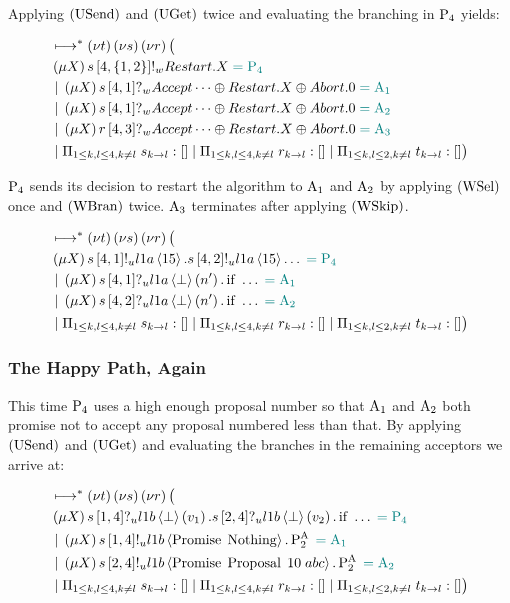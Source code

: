 Applying $\RUsend$ and $\RUget$ twice and evaluating the branching in $\Proposer{4}$ yields:

\begin{align*}
&\mapstostar \NuChannels \big (\\
&\Mu{X} \SendWeaklyP{s}{4}{\Curly{1,2}}{\Restart}{X} \comment{= \Proposer{4}}\\
&\Or \Mu{X} \ReceiveWeaklyP{s}{4}{1}{\BeginPaCont} \comment{= \Acceptor{1}}\\
&\Or \Mu{X} \ReceiveWeaklyP{s}{4}{1}{\BeginPaCont} \comment{= \Acceptor{2}}\\
&\Or \Mu{X} \ReceiveWeaklyP{r}{4}{3}{\BeginPaCont} \comment{= \Acceptor{3}}\\
&\Or \InnerSessionQueues{s}
\Or \InnerSessionQueues{r}
\Or \OuterSessionQueues
\big )
\end{align*}

$\Proposer{4}$ sends its decision to restart the algorithm to $\Acceptor{1}$ and $\Acceptor{2}$ by applying $\RWsel$ once and $\RWbran$ twice.
$\Acceptor{3}$ terminates after applying $\RWskip$.

\begin{align*}
&\mapstostar \NuChannels \big (\\
&\Mu{X} \SendUnreliableP{s}{4}{1}{\LOneA}{15}.\SendUnreliableP{s}{4}{2}{\LOneA}{15}\dots \comment{= \Proposer{4}}\\
&\Or \Mu{X} \ReceiveUnreliableP{s}{4}{1}{\LOneA}{\bot}{n'}.\If{\dots} \comment{= \Acceptor{1}}\\
&\Or \Mu{X} \ReceiveUnreliableP{s}{4}{2}{\LOneA}{\bot}{n'}.\If{\dots} \comment{= \Acceptor{2}}\\
&\Or \InnerSessionQueues{s}
\Or \InnerSessionQueues{r}
\Or \OuterSessionQueues
\big )
\end{align*}

\subsubsection{The Happy Path, Again}

This time $\Proposer{4}$ uses a high enough proposal number so that $\Acceptor{1}$ and $\Acceptor{2}$ both promise not to accept any proposal numbered less than that.
By applying $\RUsend$ and $\RUget$ and evaluating the branches in the remaining acceptors we arrive at:

\begin{align*}
&\mapstostar \NuChannels \big (\\
&\Mu{X} \ReceiveUnreliableP{s}{1}{4}{\LOneB}{\bot}{v_1}.\ReceiveUnreliableP{s}{2}{4}{\LOneB}{\bot}{v_2}.\If{\dots} \comment{= \Proposer{4}}\\
&\Or \Mu{X} \SendUnreliableP{s}{1}{4}{\LOneB}{\Promise{\Nothing}}.\PaTwo \comment{= \Acceptor{1}}\\
&\Or \Mu{X} \SendUnreliableP{s}{2}{4}{\LOneB}{\Promise{\ProposalC{10}{abc}}}.\PaTwo \comment{= \Acceptor{2}}\\
&\Or \InnerSessionQueues{s}
\Or \InnerSessionQueues{r}
\Or \OuterSessionQueues
\big )
\end{align*}

